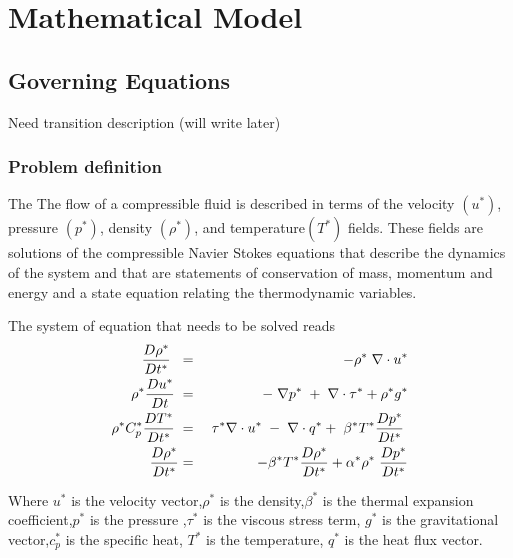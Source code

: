 \chapter{Mathematical Model}
\section{Governing Equations}
Need transition description (will write later)
\subsection{Problem definition}
The The flow of a compressible fluid is described in terms of the velocity $(u^*)$, pressure $(p^*)$, density $(\rho^*)$, and temperature$(T^*)$ fields. These fields are solutions of the compressible Navier Stokes equations that describe the dynamics of the system
and that are statements of conservation of mass, momentum and energy and a state equation relating the thermodynamic variables.  

The system of equation that needs to be solved reads
\begin{eqnarray}
\frac{D \rho^*}{D t^*}\hspace{1mm} \hspace{1mm} &=& - \rho^* \hspace{1mm}\nabla \cdot u^* \\
\rho^* \frac{D u^*}{D t} \hspace{1mm} &=& -\hspace{1mm}\nabla p^*\hspace{1mm}+\hspace{1mm}\nabla \cdot \tau^* + \rho^* g^* \\
\rho^* C_p^* \frac{D T^*}{D t^*} \hspace{1mm}&=&\hspace{1mm} \tau^* \nabla \cdot u^* \hspace{1mm}- \hspace{1mm}\nabla \cdot q^* + \hspace{1mm} \beta^* T^* \frac{D p^*}{D t^*}\hspace{1mm}\\
\frac{D \rho^*}{D t^*} &=& \hspace{1mm} - \beta^* T^* \frac{D \rho^*}{D t^*} + \alpha^* \rho^* \hspace{1mm}\frac{D p^*}{D t^*}
\end{eqnarray}

Where $u^*$ is the velocity vector,$\rho^*$ is the density,$\beta^*$ is the thermal expansion coefficient,$p^*$ is the pressure ,$\tau^*$ is the viscous stress term, $g^*$ is the gravitational vector,$c_p^*$ is the specific heat, $T^*$ is the temperature, $q^*$ is the heat flux vector. 

